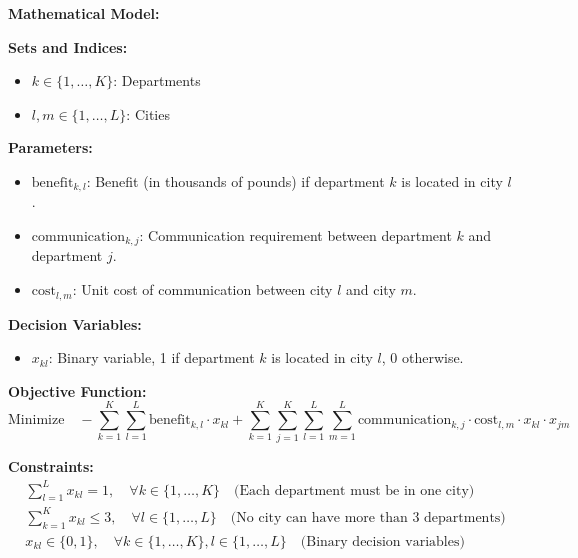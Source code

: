 \documentclass{article}
\begin{document}
\textbf{Mathematical Model:}

\textbf{Sets and Indices:}
\begin{itemize}
    \item \( k \in \{1, \ldots, K\} \): Departments
    \item \( l, m \in \{1, \ldots, L\} \): Cities
\end{itemize}

\textbf{Parameters:}
\begin{itemize}
    \item \(\text{benefit}_{k, l}\): Benefit (in thousands of pounds) if department \( k \) is located in city \( l \).
    \item \(\text{communication}_{k, j}\): Communication requirement between department \( k \) and department \( j \).
    \item \(\text{cost}_{l, m}\): Unit cost of communication between city \( l \) and city \( m \).
\end{itemize}

\textbf{Decision Variables:}
\begin{itemize}
    \item \( x_{kl} \): Binary variable, 1 if department \( k \) is located in city \( l \), 0 otherwise.
\end{itemize}

\textbf{Objective Function:}
\[
\text{Minimize} \quad -\sum_{k=1}^{K} \sum_{l=1}^{L} \text{benefit}_{k, l} \cdot x_{kl} + \sum_{k=1}^{K} \sum_{j=1}^{K} \sum_{l=1}^{L} \sum_{m=1}^{L} \text{communication}_{k, j} \cdot \text{cost}_{l, m} \cdot x_{kl} \cdot x_{jm}
\]

\textbf{Constraints:}
\begin{align}
    & \sum_{l=1}^{L} x_{kl} = 1, \quad \forall k \in \{1, \ldots, K\} \quad \text{(Each department must be in one city)} \\
    & \sum_{k=1}^{K} x_{kl} \leq 3, \quad \forall l \in \{1, \ldots, L\} \quad \text{(No city can have more than 3 departments)} \\
    & x_{kl} \in \{0, 1\}, \quad \forall k \in \{1, \ldots, K\}, l \in \{1, \ldots, L\} \quad \text{(Binary decision variables)}
\end{align}
\end{document}

